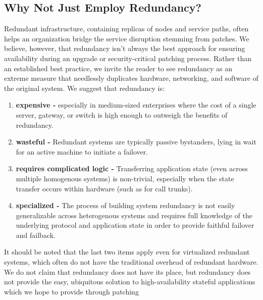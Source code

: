 \subsection{Why Not Just Employ Redundancy?}
\label{ssec:redundancy}

Redundant infrastructure, containing replicas of nodes and service
paths, often helps an organization bridge the service disruption
stemming from patches.  We believe, however, that redundancy isn't
always the best approach for ensuring availability during an upgrade
or security-critical patching process.  Rather than an established
best practice, we invite the reader to see redundancy as
an extreme measure that needlessly duplicates hardware, networking, and
software of the original system. We suggest that redundancy is: 


\renewcommand{\labelenumi}{\alph{enumi}.}

\begin{enumerate}
\item {\bf expensive -} especially in medium-sized enterprises where
  the cost of a single server, gateway, or switch is high enough to
  outweigh the benefits of redundancy.

\item {\bf wasteful -} Redundant systems are typically passive
  bystanders, lying in wait for an active machine to
  initiate a failover.

\item {{\bf requires complicated logic -}} Transferring application
  state (even across multiple homogenous systems) is non-trivial,
  especially when the state transfer occurs within hardware (such as
  for call trunks).

\item {{\bf specialized -}} The process of building system redundancy
  is not easily generalizable across heterogenous systems and requires
  full knowledge of the underlying protocol and application state in
  order to provide faithful failover and failback.
\end{enumerate}

It should be noted that the last two items apply even for virtualized
redundant systems, which often do not have the traditional overhead of
redundant hardware.  We do not claim that redundancy does not have its
place, but redundancy does not provide the easy, ubiquitous solution to
high-availability stateful applications which we hope to provide
through patching


